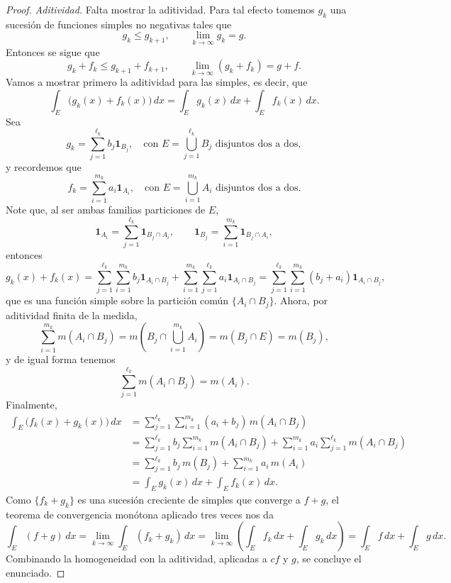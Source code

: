 \documentclass[11pt,twoside]{article}
\newcommand{\ind}{\mathbf{1}}
\begin{document}
\begin{proof}
\textit{Aditividad.} Falta mostrar la aditividad. Para tal efecto tomemos $g_{k}$ una sucesión de funciones simples no negativas tales que
\[
g_{k} \leq g_{k+1}, \qquad \lim_{k \to \infty} g_{k} = g.
\]
Entonces se sigue que
\[
g_{k} + f_{k} \leq g_{k+1} + f_{k+1}, \qquad \lim_{k \to \infty} (g_{k} + f_{k}) = g + f.
\]
Vamos a mostrar primero la aditividad para las simples, es decir, que
\[
\int_{E} \big( g_{k}(x) + f_{k}(x) \big) \, dx = \int_{E} g_{k}(x) \, dx + \int_{E} f_{k}(x) \, dx.
\]
Sea
\[
g_{k} = \sum_{j=1}^{\ell_{k}} b_{j} \ind_{B_{j}}, \quad \text{con } E = \bigcup_{j=1}^{\ell_{k}} B_{j} \text{ disjuntos dos a dos},
\]
y recordemos que
\[
f_{k} = \sum_{i=1}^{m_{k}} a_{i} \ind_{A_{i}}, \quad \text{con } E = \bigcup_{i=1}^{m_{k}} A_{i} \text{ disjuntos dos a dos}.
\]
Note que, al ser ambas familias particiones de $E$,
\[
\ind_{A_{i}} = \sum_{j=1}^{\ell_{k}} \ind_{B_{j} \cap A_{i}}, \qquad \ind_{B_{j}} = \sum_{i=1}^{m_{k}} \ind_{B_{j} \cap A_{i}},
\]
entonces
\[
g_{k}(x) + f_{k}(x) = \sum_{j=1}^{\ell_{k}} \sum_{i=1}^{m_{k}} b_{j} \ind_{A_{i} \cap B_{j}} + \sum_{i=1}^{m_{k}} \sum_{j=1}^{\ell_{k}} a_{i} \ind_{A_{i} \cap B_{j}} = \sum_{j=1}^{\ell_{k}} \sum_{i=1}^{m_{k}} (b_{j} + a_{i}) \ind_{A_{i} \cap B_{j}},
\]
que es una función simple sobre la partición común $\{A_{i} \cap B_{j}\}$. Ahora, por aditividad finita de la medida,
\[
\sum_{i=1}^{m_{k}} m(A_{i} \cap B_{j}) = m\left( B_{j} \cap \bigcup_{i=1}^{m_{k}} A_{i} \right) = m(B_{j} \cap E) = m(B_{j}),
\]
y de igual forma tenemos
\[
\sum_{j=1}^{\ell_{k}} m(A_{i} \cap B_{j}) = m(A_{i}).
\]
Finalmente,
\begin{align*}
\int_{E} \big( f_{k}(x) + g_{k}(x) \big) \, dx &= \sum_{j=1}^{\ell_{k}} \sum_{i=1}^{m_{k}} (a_{i} + b_{j})\, m(A_{i} \cap B_{j}) \\
&= \sum_{j=1}^{\ell_{k}} b_{j} \sum_{i=1}^{m_{k}} m(A_{i} \cap B_{j}) + \sum_{i=1}^{m_{k}} a_{i} \sum_{j=1}^{\ell_{k}} m(A_{i} \cap B_{j}) \\
&= \sum_{j=1}^{\ell_{k}} b_{j}\, m(B_{j}) + \sum_{i=1}^{m_{k}} a_{i}\, m(A_{i}) \\
&= \int_{E} g_{k}(x) \, dx + \int_{E} f_{k}(x) \, dx.
\end{align*}
Como $\{f_{k} + g_{k}\}$ es una sucesión creciente de simples que converge a $f + g$, el teorema de convergencia monótona aplicado tres veces nos da
\[
\int_{E} (f + g) \, dx = \lim_{k \to \infty} \int_{E} (f_{k} + g_{k}) \, dx = \lim_{k \to \infty} \left( \int_{E} f_{k} \, dx + \int_{E} g_{k} \, dx \right) = \int_{E} f \, dx + \int_{E} g \, dx.
\]
Combinando la homogeneidad con la aditividad, aplicadas a $cf$ y $g$, se concluye el enunciado.
\end{proof}
\end{document}
